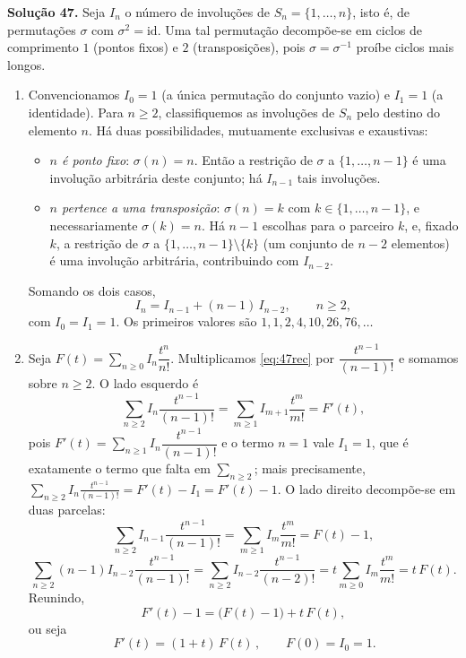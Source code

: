 \bigskip\noindent\textbf{Solução 47.}\quad
Seja $I_n$ o número de involuções de $S_n=\{1,\dots,n\}$, isto é, de permutações $\sigma$ com $\sigma^2=\mathrm{id}$. Uma tal permutação decompõe-se em ciclos de comprimento $1$ (pontos fixos) e $2$ (transposições), pois $\sigma=\sigma^{-1}$ proíbe ciclos mais longos.

\begin{enumerate}[label=(\alph*)]

\item Convencionamos $I_0=1$ (a única permutação do conjunto vazio) e $I_1=1$ (a identidade). Para $n\ge2$, classifiquemos as involuções de $S_n$ pelo destino do elemento $n$. Há duas possibilidades, mutuamente exclusivas e exaustivas:
\begin{itemize}
\item \emph{$n$ é ponto fixo}: $\sigma(n)=n$. Então a restrição de $\sigma$ a $\{1,\dots,n-1\}$ é uma involução arbitrária deste conjunto; há $I_{n-1}$ tais involuções.
\item \emph{$n$ pertence a uma transposição}: $\sigma(n)=k$ com $k\in\{1,\dots,n-1\}$, e necessariamente $\sigma(k)=n$. Há $n-1$ escolhas para o parceiro $k$, e, fixado $k$, a restrição de $\sigma$ a $\{1,\dots,n-1\}\setminus\{k\}$ (um conjunto de $n-2$ elementos) é uma involução arbitrária, contribuindo com $I_{n-2}$.
\end{itemize}
Somando os dois casos,
\begin{equation}\label{eq:47rec}
I_n=I_{n-1}+(n-1)\,I_{n-2},\qquad n\ge2,
\end{equation}
com $I_0=I_1=1$. Os primeiros valores são $1,1,2,4,10,26,76,\dots$

\item Seja $F(t)=\sum_{n\ge0}I_n\dfrac{t^n}{n!}$. Multiplicamos \eqref{eq:47rec} por $\dfrac{t^{n-1}}{(n-1)!}$ e somamos sobre $n\ge2$. O lado esquerdo é
\[
\sum_{n\ge2}I_n\frac{t^{n-1}}{(n-1)!}=\sum_{m\ge1}I_{m+1}\frac{t^{m}}{m!}=F'(t),
\]
pois $F'(t)=\sum_{n\ge1}I_n\dfrac{t^{n-1}}{(n-1)!}$ e o termo $n=1$ vale $I_1=1$, que é exatamente o termo que falta em $\sum_{n\ge2}$; mais precisamente, $\sum_{n\ge2}I_n\frac{t^{n-1}}{(n-1)!}=F'(t)-I_1=F'(t)-1$. O lado direito decompõe-se em duas parcelas:
\[
\sum_{n\ge2}I_{n-1}\frac{t^{n-1}}{(n-1)!}=\sum_{m\ge1}I_m\frac{t^m}{m!}=F(t)-1,
\]
\[
\sum_{n\ge2}(n-1)I_{n-2}\frac{t^{n-1}}{(n-1)!}=\sum_{n\ge2}I_{n-2}\frac{t^{n-1}}{(n-2)!}=t\sum_{m\ge0}I_m\frac{t^m}{m!}=t\,F(t).
\]
Reunindo,
\[
F'(t)-1=\big(F(t)-1\big)+t\,F(t),
\]
ou seja
\begin{equation}\label{eq:47ode}
\boxed{\,F'(t)=(1+t)\,F(t)\,},\qquad F(0)=I_0=1.
\end{equation}


\end{enumerate}
